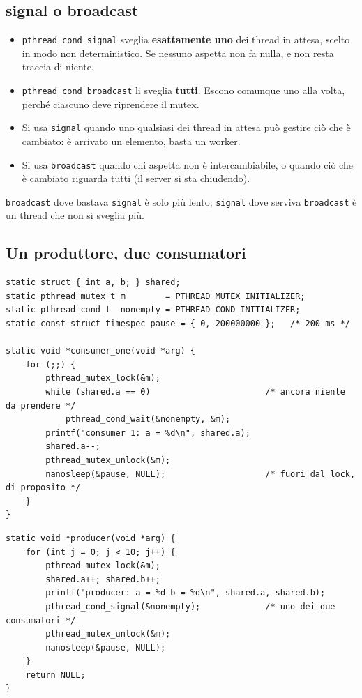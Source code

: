 \subsection{signal o broadcast}

\begin{itemize}
    \item \texttt{pthread\_cond\_signal} sveglia \textbf{esattamente uno} dei thread in attesa, scelto in modo non
          deterministico. Se nessuno aspetta non fa nulla, e non resta traccia di niente.
    \item \texttt{pthread\_cond\_broadcast} li sveglia \textbf{tutti}. Escono comunque uno alla volta, perché ciascuno deve
          riprendere il mutex.
    \item Si usa \texttt{signal} quando uno qualsiasi dei thread in attesa può gestire ciò che è cambiato: è arrivato un
          elemento, basta un worker.
    \item Si usa \texttt{broadcast} quando chi aspetta non è intercambiabile, o quando ciò che è cambiato riguarda tutti (il
          server si sta chiudendo).
\end{itemize}
\texttt{broadcast} dove bastava \texttt{signal} è solo più lento; \texttt{signal} dove serviva \texttt{broadcast} è un
thread che non si sveglia più.

\subsection{Un produttore, due consumatori}

\begin{lstlisting}[language={[POSIX]C}, style=wnumbers, title={Il consumatore}]
static struct { int a, b; } shared;
static pthread_mutex_t m        = PTHREAD_MUTEX_INITIALIZER;
static pthread_cond_t  nonempty = PTHREAD_COND_INITIALIZER;
static const struct timespec pause = { 0, 200000000 };   /* 200 ms */

static void *consumer_one(void *arg) {
    for (;;) {
        pthread_mutex_lock(&m);
        while (shared.a == 0)                       /* ancora niente da prendere */
            pthread_cond_wait(&nonempty, &m);
        printf("consumer 1: a = %d\n", shared.a);
        shared.a--;
        pthread_mutex_unlock(&m);
        nanosleep(&pause, NULL);                    /* fuori dal lock, di proposito */
    }
}
\end{lstlisting}

\begin{lstlisting}[language={[POSIX]C}, style=wnumbers, title={Il produttore}]
static void *producer(void *arg) {
    for (int j = 0; j < 10; j++) {
        pthread_mutex_lock(&m);
        shared.a++; shared.b++;
        printf("producer: a = %d b = %d\n", shared.a, shared.b);
        pthread_cond_signal(&nonempty);             /* uno dei due consumatori */
        pthread_mutex_unlock(&m);
        nanosleep(&pause, NULL);
    }
    return NULL;
}
\end{lstlisting}

